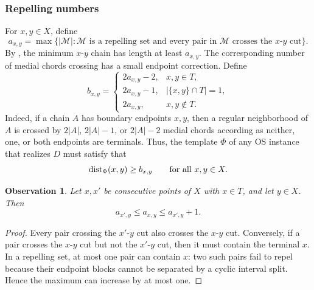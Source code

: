 \documentclass[11pt]{article}
\newtheorem{observation}[theorem]{Observation}
\newcommand{\dist}{\textnormal{dist}}
\newcommand{\mset}{{\mathcal M}}
\newcommand{\cro}{{\mathsf{cr}}}
\begin{document}

\subsubsection{Repelling numbers}

For $x,y\in X$, define
\[
   a_{x,y}=\max\{|\mset|:\mset\text{ is a repelling set and every pair in }\mset\text{ crosses the }x\text{-}y\text{ cut}\}.
\]
By , the minimum $x$-$y$ chain has length at least $a_{x,y}$. The corresponding number of medial chords crossing has a small endpoint correction.  Define
\[
 b_{x,y}= 
 \begin{cases}
  2a_{x,y}-2, & x,y\in T,\\
  2a_{x,y}-1, & |\{x,y\}\cap T|=1,\\
  2a_{x,y},   & x,y\notin T.
 \end{cases}
\]
Indeed, if a chain $A$ has boundary endpoints $x,y$, then a regular neighborhood of $A$ is crossed by $2|A|$, $2|A|-1$, or $2|A|-2$ medial chords according as neither, one, or both endpoints are terminals.  Thus, the template $\Phi$ of any OS instance that realizes $D$ must satisfy that
\begin{equation}\label{eq:template-feasible}
   \dist_\Phi(x,y)\ge b_{x,y}\qquad \text{for all }x,y\in X.
\end{equation}

\begin{observation}\label{obs:neighbor}
Let $x,x'$ be consecutive points of $X$ with $x\in T$, and let $y\in X$.  Then
\[
   a_{x',y}\le a_{x,y}\le a_{x',y}+1.
\]
\end{observation}

\begin{proof}
Every pair crossing the $x'$-$y$ cut also crosses the $x$-$y$ cut.  Conversely, if a pair crosses the $x$-$y$ cut but not the $x'$-$y$ cut, then it must contain the terminal $x$.  In a repelling set, at most one pair can contain $x$: two such pairs fail to repel because their endpoint blocks cannot be separated by a cyclic interval split.  Hence the maximum can increase by at most one.
\end{proof}
\end{document}
